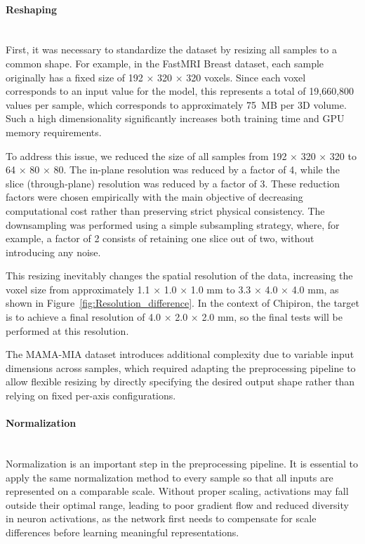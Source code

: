 \documentclass[12pt]{article}
\begin{document}
\paragraph{Reshaping}
\mbox{}\\
First, it was necessary to standardize the dataset by resizing all samples to a common shape.
For example, in the FastMRI Breast dataset, each sample originally has a fixed size of 192 × 320 × 320 voxels.
Since each voxel corresponds to an input value for the model, this represents a total of 19,660,800 values per sample, which corresponds to approximately 75~MB per 3D volume.
Such a high dimensionality significantly increases both training time and GPU memory requirements.
\vspace{0.5cm}

To address this issue, we reduced the size of all samples from 192 × 320 × 320 to 64 × 80 × 80.
The in-plane resolution was reduced by a factor of 4, while the slice (through-plane) resolution was reduced by a factor of 3.
These reduction factors were chosen empirically with the main objective of decreasing computational cost rather than preserving strict physical consistency.
The downsampling was performed using a simple subsampling strategy, where, for example, a factor of 2 consists of retaining one slice out of two, without introducing any noise.
\vspace{0.5cm}

This resizing inevitably changes the spatial resolution of the data, increasing the voxel size from approximately 1.1 × 1.0 × 1.0 mm to 3.3 × 4.0 × 4.0 mm, as shown in Figure~\ref{fig:Resolution_difference}.
In the context of Chipiron, the target is to achieve a final resolution of 4.0 × 2.0 × 2.0 mm, so the final tests will be performed at this resolution.
\vspace{0.5cm}

The MAMA-MIA dataset introduces additional complexity due to variable input dimensions across samples, which required adapting the preprocessing pipeline to allow flexible resizing by directly specifying the desired output shape rather than relying on fixed per-axis configurations.

\paragraph{Normalization}
\mbox{}\\

Normalization is an important step in the preprocessing pipeline. It is essential to apply the same normalization method to every sample so that all inputs are represented on a comparable scale. 
Without proper scaling, activations may fall outside their optimal range, leading to poor gradient flow and reduced diversity in neuron activations, as the network first needs to compensate for scale differences before learning meaningful representations.
\vspace{0.5cm}
\end{document}
